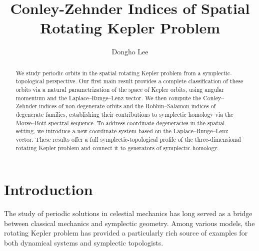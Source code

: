 \documentclass{amsart}
\begin{document}
\title{Conley-Zehnder Indices of Spatial Rotating Kepler Problem}
\author{Dongho Lee}
\maketitle

\begin{abstract}
	We study periodic orbits in the spatial rotating Kepler problem from a symplectic-topological perspective. Our first main result provides a complete classification of these orbits via a natural parametrization of the space of Kepler orbits, using angular momentum and the Laplace–Runge–Lenz vector. We then compute the Conley–Zehnder indices of non-degenerate orbits and the Robbin–Salamon indices of degenerate families, establishing their contributions to symplectic homology via the Morse–Bott spectral sequence. To address coordinate degeneracies in the spatial setting, we introduce a new coordinate system based on the Laplace–Runge–Lenz vector. These results offer a full symplectic-topological profile of the three-dimensional rotating Kepler problem and connect it to generators of symplectic homology.
\end{abstract}

\tableofcontents


\section{Introduction}

The study of periodic solutions in celestial mechanics has long served as a bridge between classical mechanics and symplectic geometry. Among various models, the rotating Kepler problem has provided a particularly rich source of examples for both dynamical systems and symplectic topologists.
\end{document}

